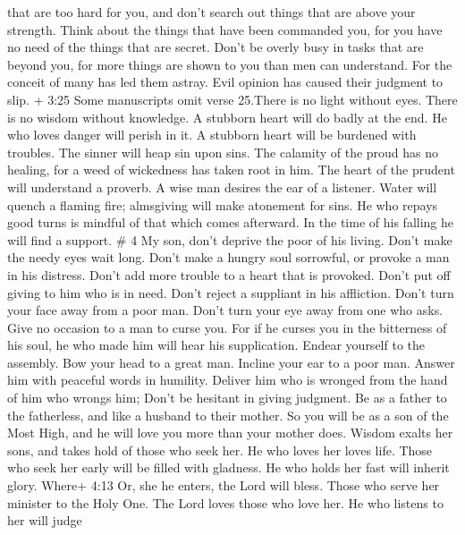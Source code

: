 that are too hard for you, and don't search out things that are above
your strength.  Think about the things that have been
commanded you, for you have no need of the things that are secret.
 Don't be overly busy in tasks that are beyond you, for
more things are shown to you than men can understand.  For
the conceit of many has led them astray. Evil opinion has caused their
judgment to slip.  + 3:25 Some manuscripts omit verse
25.There is no light without eyes. There is no wisdom without knowledge.
 A stubborn heart will do badly at the end. He who loves
danger will perish in it.  A stubborn heart will be
burdened with troubles. The sinner will heap sin upon sins.
 The calamity of the proud has no healing, for a weed of
wickedness has taken root in him.  The heart of the prudent
will understand a proverb. A wise man desires the ear of a listener.
 Water will quench a flaming fire; almsgiving will make
atonement for sins.  He who repays good turns is mindful of
that which comes afterward. In the time of his falling he will find a
support. \# 4  My son, don't deprive the poor of his living.
Don't make the needy eyes wait long.  Don't make a hungry
soul sorrowful, or provoke a man in his distress.  Don't add
more trouble to a heart that is provoked. Don't put off giving to him
who is in need.  Don't reject a suppliant in his affliction.
Don't turn your face away from a poor man.  Don't turn your
eye away from one who asks. Give no occasion to a man to curse you.
 For if he curses you in the bitterness of his soul, he who
made him will hear his supplication.  Endear yourself to the
assembly. Bow your head to a great man.  Incline your ear to
a poor man. Answer him with peaceful words in humility. 
Deliver him who is wronged from the hand of him who wrongs him; Don't be
hesitant in giving judgment.  Be as a father to the
fatherless, and like a husband to their mother. So you will be as a son
of the Most High, and he will love you more than your mother does.
 Wisdom exalts her sons, and takes hold of those who seek
her.  He who loves her loves life. Those who seek her early
will be filled with gladness.  He who holds her fast will
inherit glory. Where+ 4:13 Or, she he enters, the Lord will bless.
 Those who serve her minister to the Holy One. The Lord
loves those who love her.  He who listens to her will judge
